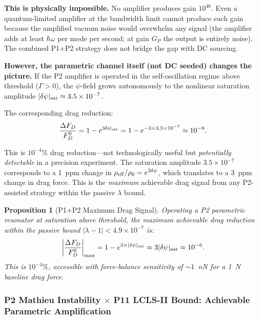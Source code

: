 \documentclass[11pt,twocolumn]{article}
\newcommand{\dpsi}{\delta\psi}
\newcommand{\lam}{\lambda}
\newtheorem{proposition}{Proposition}
\begin{document}
\textbf{This is physically impossible.} No amplifier produces gain $10^{46}$.
Even a quantum-limited amplifier at the bandwidth limit cannot produce such
gain because the amplified vacuum noise would overwhelm any signal (the
amplifier adds at least $\hbar\omega$ per mode per second; at gain $G_P$
the output is entirely noise). The combined P1+P2 strategy does not bridge
the gap with DC sourcing.

\textbf{However, the parametric channel itself (not DC seeded) changes the
picture.} If the P2 amplifier is operated in the self-oscillation regime
above threshold ($\Gamma > 0$), the $\psi$-field grows autonomously to
the nonlinear saturation amplitude $|\dpsi|_{\rm sat} \approx 3.5\times10^{-7}$.

The corresponding drag reduction:
\begin{equation}
\frac{\Delta F_D}{F_D^0} = 1 - e^{3\dpsi_{\rm sat}}
= 1 - e^{-3\times 3.5\times10^{-7}}
\approx 10^{-6}.
\label{eq:drag_sat}
\end{equation}

This is $10^{-4}\%$ drag reduction---not technologically useful but
\emph{potentially detectable} in a precision experiment. The saturation
amplitude $3.5\times10^{-7}$ corresponds to a 1~ppm change in
$\rho_{\rm eff}/\rho_0 = e^{3\dpsi}$, which translates to a 3~ppm
change in drag force. This is the \emph{maximum} achievable drag signal
from any P2-assisted strategy within the passive $\lam$ bound.

\begin{proposition}[P1+P2 Maximum Drag Signal]
\label{prop:p1p2_max}
Operating a P2 parametric resonator at saturation above threshold, the
maximum achievable drag reduction within the passive bound
$|\lam-1| < 4.9\times10^{-7}$ is:
\begin{equation}
\left|\frac{\Delta F_D}{F_D^0}\right|_{\max}
= 1 - e^{3\times|\dpsi|_{\rm sat}}
\approx 3|\dpsi|_{\rm sat}
\approx 10^{-6}.
\label{eq:max_drag}
\end{equation}
This is $10^{-4}\%$, accessible with force-balance sensitivity of $\sim 1$~nN
for a 1~N baseline drag force.
\end{proposition}

\subsubsection{P2 Mathieu Instability $\times$ P11 LCLS-II Bound:
  Achievable Parametric Amplification}
\label{sec:p2_p11}
\end{document}

